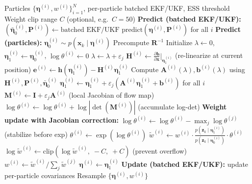 \documentclass{article}
\begin{document}
\begin{algorithm}[H]
\caption{LEDH Invertible Particle Flow Filter (Local Linearization + Jacobian Tracking)}
\begin{algorithmic}[1]
\REQUIRE Particles $\{\boldsymbol{\eta}^{(i)}, w^{(i)}\}_{i=1}^N$, per-particle batched EKF/UKF, ESS threshold
\REQUIRE Weight clip range $C$ (optional, e.g.\ $C=50$)
  \STATE \textbf{Predict (batched EKF/UKF):}
  \STATE $(\bar{\boldsymbol{\eta}}_0^{(i)}, \mathbf{P}^{(i)}) \leftarrow \text{batched EKF/UKF predict}(\boldsymbol{\eta}^{(i)}, \mathbf{P}^{(i)})$ for all $i$
  \STATE \textbf{Predict (particles):} $\boldsymbol{\eta}_0^{(i)} \sim p(\mathbf{x}_k \mid \boldsymbol{\eta}^{(i)})$
  \STATE Precompute $\mathbf{R}^{-1}$
  \STATE Initialize $\lambda \leftarrow 0$, $\boldsymbol{\eta}_1^{(i)} \leftarrow \boldsymbol{\eta}_0^{(i)}$, $\log\theta^{(i)} \leftarrow 0$
    \STATE $\lambda \leftarrow \lambda + \varepsilon_j$
      \STATE $\mathbf{H}^{(i)} \leftarrow \frac{\partial \mathbf{h}}{\partial \mathbf{x}}\Big|_{\boldsymbol{\eta}_1^{(i)}}$ \hfill (re-linearize at current position)
      \STATE $\mathbf{e}^{(i)} \leftarrow \mathbf{h}(\boldsymbol{\eta}_1^{(i)}) - \mathbf{H}^{(i)}\boldsymbol{\eta}_1^{(i)}$
      \STATE Compute $\mathbf{A}^{(i)}(\lambda), \mathbf{b}^{(i)}(\lambda)$ using $\mathbf{H}^{(i)}, \mathbf{P}^{(i)}, \bar{\boldsymbol{\eta}}_0^{(i)}$
    \ENDFOR
    \STATE $\boldsymbol{\eta}_1^{(i)} \leftarrow \boldsymbol{\eta}_1^{(i)} + \varepsilon_j(\mathbf{A}^{(i)}\boldsymbol{\eta}_1^{(i)} + \mathbf{b}^{(i)})$ for all $i$
    \STATE $\mathbf{M}^{(i)} \leftarrow \mathbf{I} + \varepsilon_j \mathbf{A}^{(i)}$ \hfill (local Jacobian of flow map)
    \STATE $\log\theta^{(i)} \leftarrow \log\theta^{(i)} + \log|\det(\mathbf{M}^{(i)})|$ \hfill (accumulate log-det)
  \ENDFOR
  \STATE \textbf{Weight update with Jacobian correction:}
  \STATE $\log\theta^{(i)} \leftarrow \log\theta^{(i)} - \max_j \log\theta^{(j)}$ \hfill (stabilize before exp)
  \STATE $\theta^{(i)} \leftarrow \exp(\log\theta^{(i)})$
  \STATE $\tilde{w}^{(i)} \leftarrow w^{(i)} \cdot \frac{p(\mathbf{z}_k \mid \boldsymbol{\eta}_1^{(i)})}{p(\mathbf{z}_k \mid \boldsymbol{\eta}_0^{(i)})} \cdot \theta^{(i)}$
    \STATE $\log \tilde{w}^{(i)} \leftarrow \text{clip}(\log \tilde{w}^{(i)},\; -C,\; +C)$ \hfill (prevent overflow)
  \ENDIF
  \STATE $w^{(i)} \leftarrow \tilde{w}^{(i)} / \sum_j \tilde{w}^{(j)}$
  \STATE $\boldsymbol{\eta}^{(i)} \leftarrow \boldsymbol{\eta}_1^{(i)}$
  \STATE \textbf{Update (batched EKF/UKF):} update per-particle covariances
    \STATE Resample $\{\boldsymbol{\eta}^{(i)}, w^{(i)}\}$
  \ENDIF
\ENDFOR
\end{algorithmic}
\end{algorithm}
\end{document}
